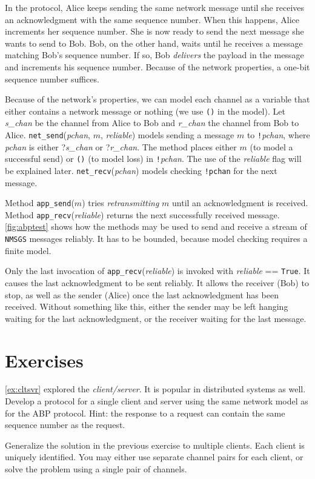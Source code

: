 \documentclass{report}
\begin{document}
In the protocol, Alice keeps sending the same network message until she
receives an acknowledgment with the same sequence number.
When this happens, Alice increments her sequence number.  She is now
ready to send the next message she wants to send to Bob.
Bob, on the other hand, waits until he receives a message matching
Bob's sequence number.  If so, Bob \emph{delivers} the payload in the
message and increments his sequence number.
Because of the network properties,  a one-bit sequence number suffices.

Because of the network's properties, we can model each
channel as a variable that either contains a network message or nothing
(we use \texttt{()} in the model).  Let \textit{s\_chan} be the channel
from Alice to Bob and \textit{r\_chan} the channel from Bob to Alice.
\texttt{net\_send}(\textit{pchan}, $m$, \textit{reliable}) models sending
a message $m$ to
\texttt{!{}}\textit{pchan}, where \textit{pchan} is either ?\textit{s\_chan}
or ?\textit{r\_chan}.
The method places either $m$ (to model a successful send)
or \texttt{()} (to model loss) in \texttt{!{}}\textit{pchan}.
The use of the \textit{reliable} flag will be explained later.
\texttt{net\_recv}(\textit{pchan}) models checking \texttt{!{}pchan} for
the next message.

Method \texttt{app\_send}($m$) tries \emph{retransmitting} $m$ until
an acknowledgment is received.
Method \texttt{app\_recv}(\textit{reliable}) returns the next successfully received
message.
\autoref{fig:abptest} shows how the methods may be used to send and receive
a stream of \texttt{NMSGS} messages reliably.
It has to be bounded, because model checking requires a finite model.

Only the last invocation of \texttt{app\_recv}(\textit{reliable}) is invoked with
\textit{reliable} == \texttt{True}.  It causes the last acknowledgment to be sent
reliably.  It allows the receiver (Bob) to stop, as well as the sender (Alice)
once the last acknowledgment has been received.
Without something like this, either the sender may be left hanging waiting
for the last acknowledgment, or the receiver waiting for the last message.

\section*{Exercises}
\begin{problems}
\item \autoref{ex:cltsvr} explored the \emph{client/server}.  It is popular
in distributed systems as well.
Develop a protocol for a single client and server using the same network
model as for the ABP protocol.
Hint: the response to a request can contain the same sequence number as the
request.
\item Generalize the solution in the previous exercise to multiple clients.
Each client is uniquely identified.  You may either use separate channel pairs
for each client, or solve the problem using a single pair of channels.
\end{problems}
\end{document}
